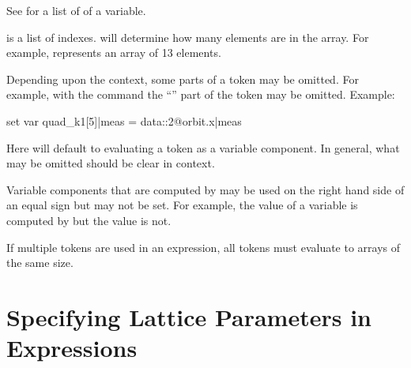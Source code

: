 See  for a list of  of a variable.

 is a list of indexes.  will determine how many elements are in
the array. For example,  represents an array of 13 elements.

Depending upon the context, some parts of a token may be omitted. For example, with the  command the ``'' part of the token may be omitted.  Example:
\begin{example}
  set var quad_k1[5]|meas = data::2@orbit.x|meas
\end{example}
Here \tao will default to evaluating a token as a variable component. In general, what may be
omitted should be clear in context.

Variable components that are computed by \tao may be used on the right hand side of an equal sign
but may not be set. For example, the  value of a variable is computed by \tao but the
 value is not.

If multiple tokens are used in an expression, all tokens must evaluate to arrays of the same size.

\section{Specifying Lattice Parameters in Expressions}
\label{s:lat.token}

